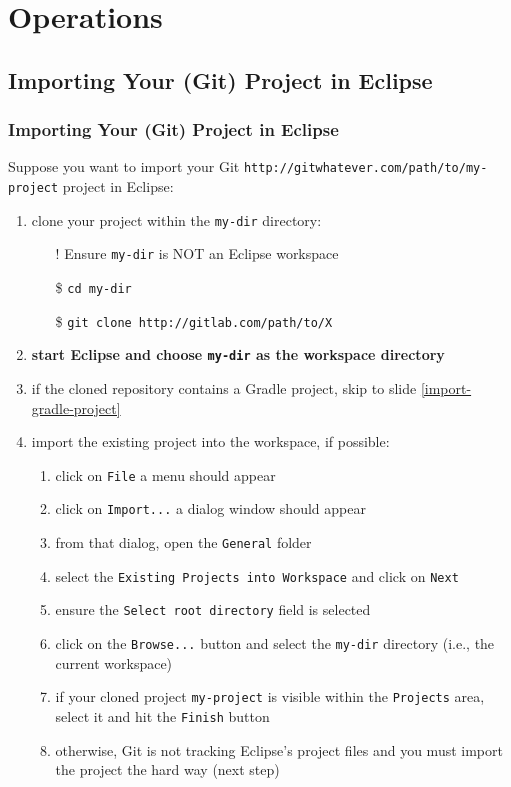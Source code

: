 \documentclass[handout]{beamer}\mode<presentation>{\usetheme{AMSCesenaPurpleAndGold}}
\begin{document}
\section{Operations}

\subsection{Importing Your (Git) Project in Eclipse}

\begin{frame}[c,allowframebreaks]
\frametitle{Importing Your (Git) Project in Eclipse} 
    Suppose you want to import your Git \texttt{http://gitwhatever.com/path/to/\alert{my-project}} project in Eclipse:
    \begin{enumerate}
        \item clone your project within the \texttt{\alert{my-dir}} directory:
        \begin{itemize}
            \item[!] Ensure \texttt{my-dir} is NOT an Eclipse workspace
            \item[\$] \texttt{cd \alert{my-dir}}
            \item[\$] \texttt{git clone http://gitlab.com/path/to/X} 
        \end{itemize}
        
        \item \textbf{start Eclipse and choose \texttt{\alert{my-dir}} as the workspace directory}
        
        \item if the cloned repository contains a Gradle project, skip to slide \ref{import-gradle-project}
        
        \item import the existing project into the workspace, if possible:
        \begin{enumerate}
            \item click on \texttt{File} a menu should appear
            \item click on \texttt{Import...} a dialog window should appear
            \item from that dialog, open the \texttt{General} folder
            \item select the \texttt{Existing Projects into Workspace} and click on \texttt{Next}
            \item ensure the \texttt{Select root directory} field is selected
            \item click on the \texttt{Browse...} button and select the \texttt{\alert{my-dir}} directory (i.e.,  the current workspace)
            \item if your cloned project \texttt{\alert{my-project}} is visible within the \texttt{Projects} area, select it and hit the \texttt{Finish} button
            \item otherwise, Git is not tracking Eclipse's project files and you must import the project the hard way (next step)
        \end{enumerate}
        

\end{enumerate}
\end{frame}
\end{document}

